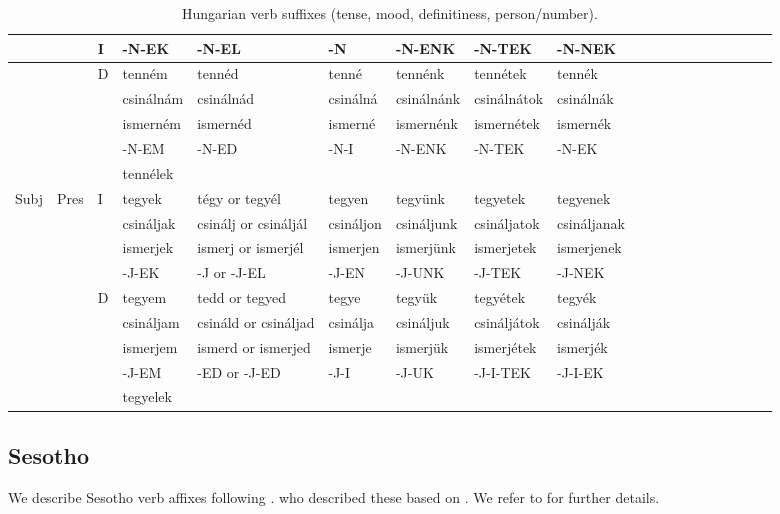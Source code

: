 \documentclass[11pt,letterpaper]{article}
\begin{document}
\begin{table}[]
{\begin{tabular}{lll||llllllllllllllll}
  & &   I    &-N-EK &	-N-EL &	-N &	-N-ENK &	-N-TEK &	-N-NEK \\\hline
   &&  D    &tenném &	tennéd &	tenné &	tennénk &	tennétek &	tennék \\
   &&       & csinálnám &	csinálnád &	csinálná &	csinálnánk &	csinálnátok &	csinálnák \\
 &&&  ismerném &	ismernéd &	ismerné &	ismernénk 	&ismernétek &	ismernék \\
&&      &-N-EM &	-N-ED &	-N-I &	-N-ENK &	-N-TEK &	-N-EK \\ \hline
       &&  &tennélek \\ \hline
Subj & Pres & I         &tegyek &	tégy or tegyél &	tegyen &	tegyünk &	tegyetek &	tegyenek \\
     &      &           & csináljak &	csinálj or
csináljál &	csináljon &	csináljunk& 	csináljatok &	csináljanak \\
&&&ismerjek &	ismerj or
ismerjél &	ismerjen &	ismerjünk &	ismerjetek &	ismerjenek \\
 &  &          &-J-EK &	-J or -J-EL &	-J-EN &	-J-UNK &	-J-TEK &	-J-NEK \\ \hline
&&D         &tegyem &	tedd or tegyed &	tegye &	tegyük& 	tegyétek &	tegyék \\
&&          & csináljam &	csináld or
csináljad &	csinálja &	csináljuk &	csináljátok &	csinálják \\
&&&ismerjem &	ismerd or
ismerjed &	ismerje &	ismerjük &	ismerjétek & ismerjék
 \\
&&         &-J-EM &	-ED or -J-ED &	-J-I &	-J-UK & 	-J-I-TEK &	-J-I-EK \\ \hline
  &&       &tegyelek \\
    \end{tabular}
    }
    \caption{Hungarian verb suffixes (tense, mood, definitiness, person/number).}
    \label{tab:hungarian-paradigms}
\end{table}


\subsection{Sesotho}

We describe Sesotho verb affixes following \cite{Hahn2020modeling}.
who described these based on \citep{doke1967textbook, guma1971outline, demuth1992acquisition}.
We refer to \cite{Hahn2020modeling} for further details.
\end{document}
